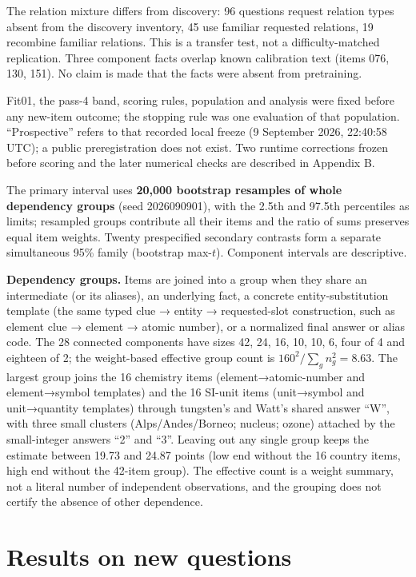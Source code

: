 The relation mixture differs from discovery: 96 questions request
relation types absent from the discovery inventory, 45 use familiar
requested relations, 19 recombine familiar relations. This is a transfer
test, not a difficulty-matched replication. Three component facts
overlap known calibration text (items 076, 130, 151). No claim is made
that the facts were absent from pretraining.

Fit01, the pass-4 band, scoring rules, population and analysis were
fixed before any new-item outcome; the stopping rule was one evaluation
of that population. ``Prospective'' refers to that recorded local freeze
(9 September 2026, 22:40:58 UTC); a public preregistration does not
exist. Two runtime corrections frozen before scoring and the later
numerical checks are described in Appendix B.

The primary interval uses \textbf{20,000 bootstrap resamples of whole
dependency groups} (seed 2026090901), with the 2.5th and 97.5th
percentiles as limits; resampled groups contribute all their items and
the ratio of sums preserves equal item weights. Twenty prespecified
secondary contrasts form a separate simultaneous 95\% family (bootstrap
max-\(t\)). Component intervals are descriptive.

\textbf{Dependency groups.} Items are joined into a group when they
share an intermediate (or its aliases), an underlying fact, a concrete
entity-substitution template (the same typed clue → entity →
requested-slot construction, such as element clue → element → atomic
number), or a normalized final answer or alias code. The 28 connected
components have sizes 42, 24, 16, 10, 10, 6, four of 4 and eighteen of
2; the weight-based effective group count is
\(160^2/\sum_g n_g^2 = 8.63\). The largest group joins the 16 chemistry
items (element→atomic-number and element→symbol templates) and the 16
SI-unit items (unit→symbol and unit→quantity templates) through
tungsten's and Watt's shared answer ``W'', with three small clusters
(Alps/Andes/Borneo; nucleus; ozone) attached by the small-integer
answers ``2'' and ``3''. Leaving out any single group keeps the estimate
between 19.73 and 24.87 points (low end without the 16 country items,
high end without the 42-item group). The effective count is a weight
summary, not a literal number of independent observations, and the
grouping does not certify the absence of other dependence.

\section{Results on new questions}\label{results-on-new-questions}

